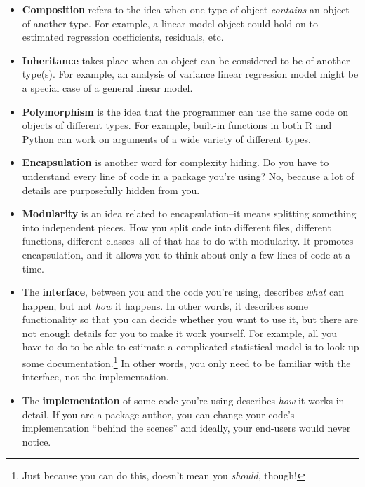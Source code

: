 \documentclass[12pt,krantz2]{krantz}
\begin{document}
\begin{itemize}
\item
  \textbf{Composition} refers to the idea when one type of object \emph{contains} an object of another type. For example, a linear model object could hold on to estimated regression coefficients, residuals, etc.
\item
  \textbf{Inheritance} takes place when an object can be considered to be of another type(s). For example, an analysis of variance linear regression model might be a special case of a general linear model.
\item
  \textbf{Polymorphism} is the idea that the programmer can use the same code on objects of different types. For example, built-in functions in both R and Python can work on arguments of a wide variety of different types.
\item
  \textbf{Encapsulation} is another word for complexity hiding. Do you have to understand every line of code in a package you're using? No, because a lot of details are purposefully hidden from you.
\item
  \textbf{Modularity} is an idea related to encapsulation--it means splitting something into independent pieces. How you split code into different files, different functions, different classes--all of that has to do with modularity. It promotes encapsulation, and it allows you to think about only a few lines of code at a time.
\item
  The \textbf{interface}, between you and the code you're using, describes \emph{what} can happen, but not \emph{how} it happens. In other words, it describes some functionality so that you can decide whether you want to use it, but there are not enough details for you to make it work yourself. For example, all you have to do to be able to estimate a complicated statistical model is to look up some documentation.\footnote{Just because you can do this, doesn't mean you \emph{should}, though!} In other words, you only need to be familiar with the interface, not the implementation.
\item
  The \textbf{implementation} of some code you're using describes \emph{how} it works in detail. If you are a package author, you can change your code's implementation ``behind the scenes'' and ideally, your end-users would never notice.
\end{itemize}
\end{document}
